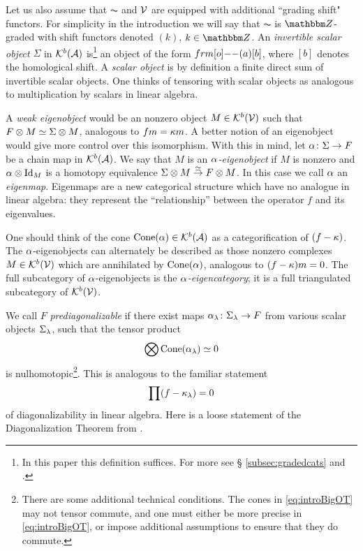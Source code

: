 Let us also assume that $\AC$ and ${\mathcal{V}}$ are equipped with additional ``grading shift" functors. For simplicity in the introduction we will say that $\AC$ is $\Z$-graded with shift
functors denoted $(k)$, $k\in \Z$. An \emph{invertible scalar object} $\Sigma$ in ${\mathcal{K}}^b({\mathcal{A}})$ is\footnote{In this paper this definition suffices. For more see \S
\ref{subsec:gradedcats} and \cite{ElHog17a}.} an object of the form $\one(a)[b]$, where $[b]$ denotes the homological shift. A \emph{scalar object} is by definition a finite direct sum
of invertible scalar objects. One thinks of tensoring with scalar objects as analogous to multiplication by scalars in linear algebra.

A \emph{weak eigenobject} would be an nonzero object $M \in {\mathcal{K}}^b({\mathcal{V}})$ such that $F\otimes M \simeq \Sigma \otimes M$, analogous to $fm = \kappa m$. A better notion of an eigenobject
would give more control over this isomorphism. With this in mind, let $\alpha \colon \Sigma \rightarrow F$ be a chain map in ${\mathcal{K}}^b({\mathcal{A}})$. We say that $M$ is an \emph{$\alpha$-eigenobject} if $M$ is
nonzero and $\alpha\otimes \operatorname{Id}_M$ is a homotopy equivalence $\Sigma \otimes M \buildrel\simeq\over \to F \otimes M$. In this case we call $\alpha$ an \emph{eigenmap}. Eigenmaps are a new
categorical structure which have no analogue in linear algebra: they represent the ``relationship'' between the operator $f$ and its eigenvalues.

One should think of the cone $\operatorname{Cone}(\alpha)\in {\mathcal{K}}^b({\mathcal{A}})$ as a categorification of $(f - \kappa)$. The $\alpha$-eigenobjects can alternately be described as those nonzero complexes $M\in
{\mathcal{K}}^b({\mathcal{V}})$ which are annihilated by $\operatorname{Cone}(\alpha)$, analogous to $(f-\kappa)m=0$. The full subcategory of $\alpha$-eigenobjects is the \emph{$\alpha$-eigencategory}; it is a full triangulated
subcategory of ${\mathcal{K}}^b({\mathcal{V}})$.


We call $F$ \emph{prediagonalizable} if there exist maps $\alpha_\lambda \colon \Sigma_\lambda \rightarrow F$ from various scalar objects $\Sigma_\lambda$, such that the tensor product \begin{equation}\label{eq:introBigOT} \bigotimes \operatorname{Cone}(\alpha_\lambda) \simeq 0 \end{equation} is nulhomotopic\footnote{There are some additional technical conditions. The cones in \eqref{eq:introBigOT} may not tensor commute, and one must either be more precise in \eqref{eq:introBigOT}, or impose additional assumptions to ensure that they do commute.}. This is analogous to the familiar statement \begin{equation} \prod (f - \kappa_\lambda) = 0 \end{equation} of diagonalizability in linear algebra. Here is a loose statement of the Diagonalization Theorem from \cite{ElHog17a}.

